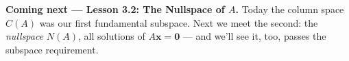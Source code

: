 \documentclass[10pt]{article}
\newcommand{\xx}{\mathbf{x}}
\newcommand{\zero}{\mathbf{0}}
\begin{document}
\begin{spiralbox}
\textbf{Coming next --- Lesson 3.2: The Nullspace of $A$.} Today the column space $C(A)$ was our
first fundamental subspace. Next we meet the second: the \emph{nullspace} $N(A)$, all solutions of
$A\xx=\zero$ --- and we'll see it, too, passes the subspace requirement.
\end{spiralbox}
\end{document}
